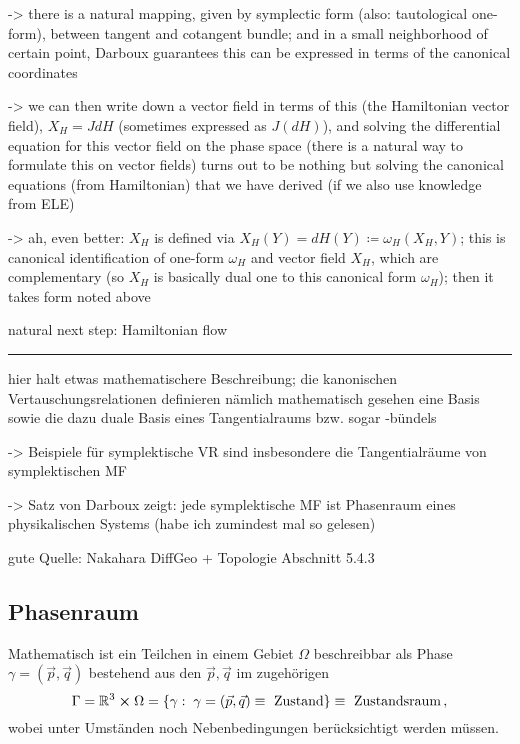 \documentclass[../class_mech_main.tex]{subfiles}
\begin{document}
-> there is a natural mapping, given by symplectic form (also: tautological one-form), between tangent and cotangent bundle; and in a small neighborhood of certain point, Darboux guarantees this can be expressed in terms of the canonical coordinates

-> we can then write down a vector field in terms of this (the Hamiltonian vector field), $X_H = J dH$ (sometimes expressed as $J(dH)$), and solving the differential equation for this vector field on the phase space (there is a natural way to formulate this on vector fields) turns out to be nothing but solving the canonical equations (from Hamiltonian) that we have derived (if we also use knowledge from ELE)

-> ah, even better: $X_H$ is defined via $X_H(Y) = dH(Y) \coloneqq \omega_H(X_H, Y)$; this is canonical identification of one-form $\omega_H$ and vector field $X_H$, which are complementary (so $X_H$ is basically dual one to this canonical form $\omega_H$); then it takes form noted above


natural next step: Hamiltonian flow



\hrule



hier halt etwas mathematischere Beschreibung; die kanonischen Vertauschungsrelationen definieren nämlich mathematisch gesehen eine Basis sowie die dazu duale Basis eines Tangentialraums bzw. sogar -bündels

-> Beispiele für symplektische VR sind insbesondere die Tangentialräume von symplektischen MF

-> Satz von Darboux zeigt: jede symplektische MF ist Phasenraum eines physikalischen Systems (habe ich zumindest mal so gelesen)


gute Quelle: Nakahara DiffGeo + Topologie Abschnitt 5.4.3

	\subsection{Phasenraum}
Mathematisch ist ein Teilchen in einem Gebiet $\Omega$ beschreibbar als Phase $\gamma = (\vec{p}, \vec{q})$ bestehend aus den  $\vec{p}, \vec{q}$ im zugehörigen 
\begin{equation}
\Gamma = \mathbb{R}^3 \cross \Omega = \qty{\gamma: \; \gamma = (\vec{p}, \vec{q}) \equiv \text{ Zustand}} \equiv \text{ Zustandsraum} \, ,
\end{equation}
wobei unter Umständen noch Nebenbedingungen berücksichtigt werden müssen.
\end{document}
